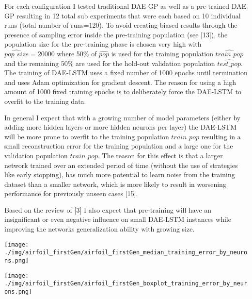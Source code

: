 \documentclass[
  11pt,
]{article}
\let\origfigure\figure
\let\endorigfigure\endfigure
\renewenvironment{figure}[1][2] {
    \expandafter\origfigure\expandafter[H]
} {
    \endorigfigure
}
\begin{document}
For each configuration I tested traditional DAE-GP as well as a
pre-trained DAE-GP resulting in 12 total sub experiments that were each
based on 10 individual runs (total number of runs=\(120\)). To avoid
creating biased results through the presence of sampling error inside
the pre-training population (see {[}13{]}), the population size for the
pre-training phase is chosen very high with \(\hat{pop\_size}=20000\)
where 50\% of \(\hat{pop}\) is used for the training population
\(\hat{train\_pop}\) and the remaining 50\% are used for the hold-out
validation population \(\hat{test\_pop}\). The training of DAE-LSTM uses
a fixed number of 1000 epochs until termination and uses Adam
optimization for gradient descent. The reason for using a high amount of
1000 fixed training epochs is to deliberately force the DAE-LSTM to
overfit to the training data.

In general I expect that with a growing number of model parameters
(either by adding more hidden layers or more hidden neurons per layer)
the DAE-LSTM will be more prone to overfit to the training population
\(train\_pop\) resulting in a small reconstruction error for the
training population and a large one for the validation population
\(train\_pop\). The reason for this effect is that a larger network
trained over an extended period of time (without the use of strategies
like early stopping), has much more potential to learn noise from the
training dataset than a smaller network, which is more likely to result
in worsening performance for previously unseen cases {[}15{]}.

Based on the review of {[}3{]} I also expect that pre-training will have
an insignificant or even negative influence on small DAE-LSTM instances
while improving the networks generalization ability with growing size.

\begin{figure}
\centering
\texttt{[image: ./img/airfoil\_firstGen/airfoil\_firstGen\_median\_training\_error\_by\_neurons.png]}
\caption{First Generation Median Training Error for variable number of
hidden Neurons - Airfoil}
\end{figure}

\begin{figure}
\centering
\texttt{[image: ./img/airfoil\_firstGen/airfoil\_firstGen\_boxplot\_training\_error\_by\_neurons.png]}
\caption{First Generation final Training Error for variable number of
hidden Neurons - Airfoil}
\end{figure}
\end{document}
